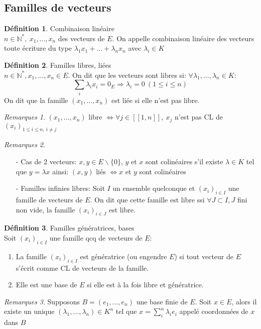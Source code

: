 \documentclass[fleqn]{article}
\theoremstyle{definition} \newtheorem*{defi}{D\'efinition}
\theoremstyle{definition} \newtheorem*{theo}{Th\'eor\`eme}
\theoremstyle{definition} \newtheorem*{coro}{Corollaire}
\theoremstyle{definition} \newtheorem*{nota}{Notation}
\theoremstyle{remark} \newtheorem*{rqs}{Remarques}
\theoremstyle{definition} \newtheorem*{prop}{Propri\'et\'e}
\begin{document}
\subsection{Familles de vecteurs}
\begin{defi} Combinaison lin\'eaire \\
	$n \in \mathbb{N}^*,\ x_1, \hdots, x_n$ des vecteurs de $E$. On appelle combinaison lin\'eaire des vecteurs toute \'ecriture du type
	$\lambda_1 x_1 + \hdots + \lambda_n x_n $ avec $\lambda_i \in K$
\end{defi}

\begin{defi} Familles libres, li\'ees \\
	$n \in \mathbb{N}^*, x_1, \hdots, x_n \in E$. On dit que les vecteurs sont libres si: $\forall \lambda_1, \hdots, \lambda_n \in K$:
	\[\sum_i \lambda_i x_i = 0_E \Rightarrow \lambda_i = 0\ (1 \leq i \leq n)\]
	On dit que la famille $(x_1, \hdots, x_n)$ est li\'ee si elle n'est pas libre.

	\begin{rqs}
		$(x_1, \hdots, x_n)$ libre $\Leftrightarrow \forall j \in [\![1,n]\!],\ x_j$ n'est pas CL de $(x_i)_{1 \leq i \leq n,\ i \neq j}$
	\end{rqs}
\end{defi}

\begin{rqs} $ $
	\begin{enumerate}
		\item [-] Cas de 2 vecteurs:
		$x,y \in E\backslash \{0\}$, $y$ et $x$ sont colin\'eaires s'il existe $\lambda \in K$ tel que $y = \lambda x$
		ainsi: $(x,y)$ li\'es $\Leftrightarrow x$ et $y$ sont colin\'eaires
		\item [-] Familles infinies libres:
		Soit $I$ un ensemble quelconque et $(x_i)_{i \in I}$ une famille de vecteurs de $E$. On dit que cette famille
		est libre ssi $\forall J \subset I, J$ fini non vide, la famille $(x_i)_{i \in J}$ est libre.
	\end{enumerate}
\end{rqs}

\begin{defi} Familles g\'en\'eratrices, bases\\
	Soit $(x_i)_{i \in I}$ une famille qcq de vecteurs de $E$:
	\begin{enumerate}
		\item La famille $(x_i)_{i \in I}$ est g\'en\'eratrice (ou engendre $E$) si tout vecteur de $E$ s'\'ecrit comme CL de vecteurs de
			la famille.
		\item Elle est une base de $E$ si elle est \`a la fois libre et g\'en\'eratrice.
	\end{enumerate}

	\begin{rqs} Supposons $B= (e_1, \hdots, e_n)$ une base finie de $E$. Soit $x \in E$, alors il existe un unique
		$(\lambda_1, \hdots, \lambda_n) \in K^n$ tel que $x = \sum_i^n \lambda_i e_i$ appel\'e coordonn\'ees de $x$ dans $B$\\
	\end{rqs}
\end{defi}
\end{document}
